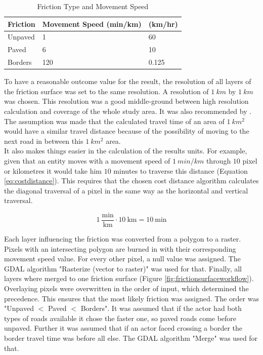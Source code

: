 \documentclass[11pt, a4paper]{report}
\begin{document}
\begin{table}[H]
    \centering
    \begin{tabular}{|l|l|l|} \hline 
        
        Friction & Movement Speed (min/km) & (km/hr) \\ \hline  
        Unpaved & 1 & 60 \\ \hline  
        Paved & 6 & 10 \\ \hline  
        Borders & 120 & 0.125 \\ \hline 
    \end{tabular}
    \caption{Friction Type and Movement Speed}
    \label{tab:frictionsurface}
\end{table}

To have a reasonable outcome value for the result, the resolution of all layers of the friction surface was set to the same resolution. A resolution of $1 \ km$ by $1 \ km$ was chosen. This resolution was a good middle-ground between high resolution calculation and coverage of the whole study area. It was also recommended by \citet{european_commission_joint_research_centre_global_2021}. The assumption was made that the calculated travel time of an area of $1 \ km^2$ would have a similar travel distance because of the possibility of moving to the next road in between this $1 \ km^2$ area.  \\
%
It also makes things easier in the calculation of the results units. For example, given that an entity moves with a movement speed of $1 \ min/km$ through $10$ pixel or kilometres it would take him $10$ minutes to traverse this distance (Equation \ref{eq:costdistance}). This requires that the chosen cost distance algorithm calculates the diagonal traversal of a pixel in the same way as the horizontal and vertical traversal. 

\begin{equation}
    1 \ \frac{\text{min}}{\text{km}} \cdot 10 \ \text{km} = 10 \ \text{min}
    \label{eq:costdistance}
\end{equation}

Each layer influencing the friction was converted from a polygon to a raster. Pixels with an intersecting polygon are burned in with their corresponding movement speed value. For every other pixel, a null value was assigned. The GDAL algorithm "Rasterize (vector to raster)" was used for that.
Finally, all layers where merged to one friction surface (Figure \ref{fig:frictionsurfaceworkflow}). Overlaying pixels were overwritten in the order of input, which determined the precedence. This ensures that the most likely friction was assigned. The order was "Unpaved $<$ Paved $<$ Borders". It was assumed that if the actor had both types of roads available it chose the faster one, so paved roads come before unpaved. Further it was assumed that if an actor faced crossing a border the border travel time was before all else. The GDAL algorithm "Merge" was used for that.
\end{document}
